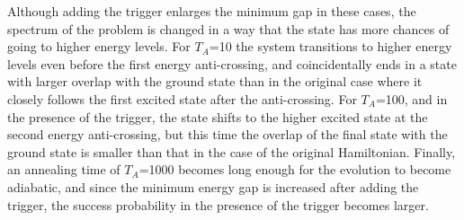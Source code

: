 \documentclass[../main.tex]{subfiles}
\begin{document}
Although adding the trigger enlarges the minimum gap in these cases, the spectrum of the problem is changed in a way that the state has more chances of going to higher energy levels. For $T_A$=10 the system transitions to higher energy levels even before the first energy anti-crossing, and coincidentally ends in a state with larger overlap with the ground state than in the original case where it closely follows the first excited state after the anti-crossing. For $T_A$=100, and in the presence of the trigger, the state shifts to the higher excited state at the second energy anti-crossing, but this time the overlap of the final state with the ground state is smaller than that in the case of the original Hamiltonian. Finally, an annealing time of $T_A$=1000 becomes long enough for the evolution to become adiabatic, and since the minimum energy gap is increased after adding the trigger, the success probability in the presence of the trigger becomes larger.\\
\end{document}
